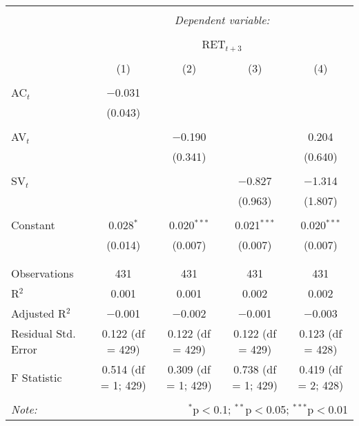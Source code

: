 
\begin{table}[!htbp] \centering 
  \caption{} 
  \label{} 
\begin{tabular}{@{\extracolsep{5pt}}lcccc} 
\\[-1.8ex]\hline 
\hline \\[-1.8ex] 
 & \multicolumn{4}{c}{\textit{Dependent variable:}} \\ 
\cline{2-5} 
\\[-1.8ex] & \multicolumn{4}{c}{RET$_{t+3}$} \\ 
\\[-1.8ex] & (1) & (2) & (3) & (4)\\ 
\hline \\[-1.8ex] 
 AC$_{t}$ & $-$0.031 &  &  &  \\ 
  & (0.043) &  &  &  \\ 
  & & & & \\ 
 AV$_{t}$ &  & $-$0.190 &  & 0.204 \\ 
  &  & (0.341) &  & (0.640) \\ 
  & & & & \\ 
 SV$_{t}$ &  &  & $-$0.827 & $-$1.314 \\ 
  &  &  & (0.963) & (1.807) \\ 
  & & & & \\ 
 Constant & 0.028$^{*}$ & 0.020$^{***}$ & 0.021$^{***}$ & 0.020$^{***}$ \\ 
  & (0.014) & (0.007) & (0.007) & (0.007) \\ 
  & & & & \\ 
\hline \\[-1.8ex] 
Observations & 431 & 431 & 431 & 431 \\ 
R$^{2}$ & 0.001 & 0.001 & 0.002 & 0.002 \\ 
Adjusted R$^{2}$ & $-$0.001 & $-$0.002 & $-$0.001 & $-$0.003 \\ 
Residual Std. Error & 0.122 (df = 429) & 0.122 (df = 429) & 0.122 (df = 429) & 0.123 (df = 428) \\ 
F Statistic & 0.514 (df = 1; 429) & 0.309 (df = 1; 429) & 0.738 (df = 1; 429) & 0.419 (df = 2; 428) \\ 
\hline 
\hline \\[-1.8ex] 
\textit{Note:}  & \multicolumn{4}{r}{$^{*}$p$<$0.1; $^{**}$p$<$0.05; $^{***}$p$<$0.01} \\ 
\end{tabular} 
\end{table} 
